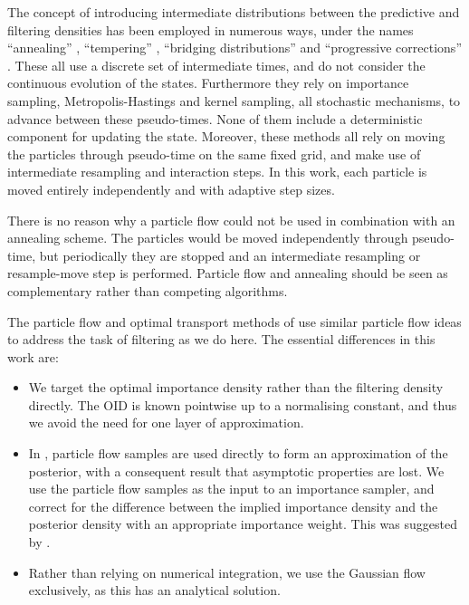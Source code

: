 \documentclass{article}
\begin{document}
The concept of introducing intermediate distributions between the predictive and filtering densities has been employed in numerous ways, under the names ``annealing'' \citep{Neal2001,Deutscher2000,Gall2007}, ``tempering'' \citep{DelMoral2006}, ``bridging distributions'' \citep{Godsill2001b} and ``progressive corrections'' \citep{Oudjane2000}. These all use a discrete set of intermediate times, and do not consider the continuous evolution of the states. Furthermore they rely on importance sampling, Metropolis-Hastings and kernel sampling, all stochastic mechanisms, to advance between these pseudo-times. None of them include a deterministic component for updating the state. Moreover, these methods all rely on moving the particles through pseudo-time on the same fixed grid, and make use of intermediate resampling and interaction steps. In this work, each particle is moved entirely independently and with adaptive step sizes.

There is no reason why a particle flow could not be used in combination with an annealing scheme. The particles would be moved independently through pseudo-time, but periodically they are stopped and an intermediate resampling or resample-move step is performed. Particle flow and annealing should be seen as complementary rather than competing algorithms.

The particle flow and optimal transport methods of \citep{Daum2008,Daum2011d,Reich2011,Reich2012a} use similar particle flow ideas to address the task of filtering as we do here. The essential differences in this work are:
%
\begin{itemize}
  \item We target the optimal importance density rather than the filtering density directly. The OID is known pointwise up to a normalising constant, and thus we avoid the need for one layer of approximation.
  \item In \citep{Daum2008,Daum2011d,Reich2011,Reich2012a}, particle flow samples are used directly to form an approximation of the posterior, with a consequent result that asymptotic properties are lost. We use the particle flow samples as the input to an importance sampler, and correct for the difference between the implied importance density and the posterior density with an appropriate importance weight. This was suggested by \cite{Reich2012}.
  \item Rather than relying on numerical integration, we use the Gaussian flow exclusively, as this has an analytical solution.
\end{itemize}
\end{document}
